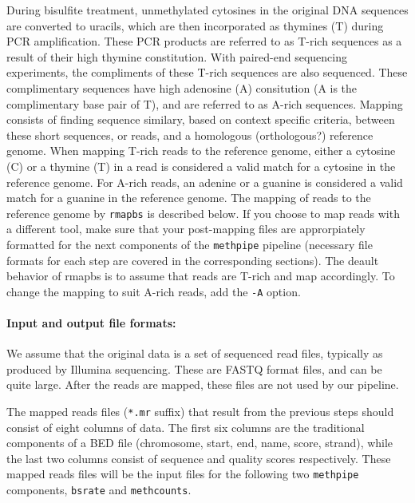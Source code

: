 \documentclass[10pt]{article}
\newcommand{\meth}{\texttt{methpipe}}
\newcommand{\prog}[1]{\texttt{#1}}
\newcommand{\fn}[1]{\texttt{#1}}
\newcommand{\op}[1]{\texttt{#1}}
\begin{document}
During bisulfite treatment, unmethylated cytosines in the original DNA
sequences are converted to uracils, which are then incorporated as
thymines (T) during PCR amplification. These PCR products are referred
to as T-rich sequences as a result of their high thymine
constitution. With paired-end sequencing experiments, the compliments
of these T-rich sequences are also sequenced.  These complimentary
sequences have high adenosine (A) consitution (A is the complimentary
base pair of T), and are referred to as A-rich sequences. Mapping
consists of finding sequence similary, based on context specific
criteria, between these short sequences, or reads, and a homologous
(orthologous?) reference genome.  When mapping T-rich reads to the
reference genome, either a cytosine (C) or a thymine (T) in a read is
considered a valid match for a cytosine in the reference genome. For
A-rich reads, an adenine or a guanine is considered a valid match for
a guanine in the reference genome. The mapping of reads to the
reference genome by \prog{rmapbs} is described below. If you choose
to map reads with a different tool, make sure that your post-mapping
files are approrpiately formatted for the next components of the
\meth{} pipeline (necessary file formats for each step are covered in
the corresponding sections).  The deault behavior of rmapbs is to
assume that reads are T-rich and map accordingly. To change the
mapping to suit A-rich reads, add the \op{-A} option.

\paragraph{Input and output file formats:} We assume that the original
data is a set of sequenced read files, typically as produced by
Illumina sequencing. These are FASTQ format files, and can be quite
large. After the reads are mapped, these files are not used by our
pipeline.

The mapped reads files (\fn{*.mr} suffix) that result from the previous
steps should consist of eight columns of data. The first six columns
are the traditional components of a BED file (chromosome, start, end,
name, score, strand), while the last two columns consist of sequence
and quality scores respectively. These mapped reads files will be the
input files for the following two \meth{} components, \prog{bsrate}
and \prog{methcounts}.
\end{document}
